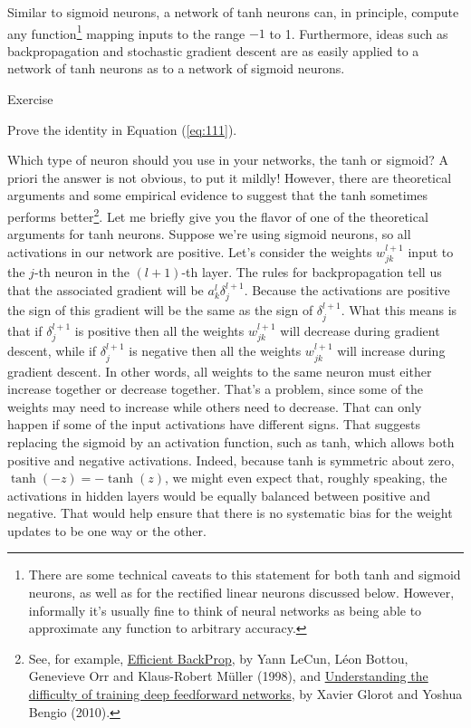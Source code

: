\documentclass[a4paper,twoside,10pt]{book}
\begin{document}
Similar to sigmoid neurons, a network of tanh neurons can, in principle, compute any function\footnote{There are some technical caveats to this statement for both tanh and sigmoid neurons, as well as for the rectified linear neurons discussed below. However, informally it's usually fine to think of neural networks as being able to approximate any function to arbitrary accuracy.} mapping inputs to the range $-1$ to 1. Furthermore, ideas such as backpropagation and stochastic gradient descent are as easily applied to a network of tanh neurons as to a network of sigmoid neurons.

\begin{exercize}{Exercise}
	\item Prove the identity in Equation (\ref{eq:111}).
\end{exercize}
Which type of neuron should you use in your networks, the tanh or sigmoid? A priori the answer is not obvious, to put it mildly! However, there are theoretical arguments and some empirical evidence to suggest that the tanh sometimes performs better\footnote{See, for example, \href{http://yann.lecun.com/exdb/publis/pdf/lecun-98b.pdf}{Efficient BackProp}, by Yann LeCun, L\'eon Bottou, Genevieve Orr and Klaus-Robert M\"uller (1998), and \href{http://jmlr.org/proceedings/papers/v9/glorot10a/glorot10a.pdf}{Understanding the difficulty of training deep feedforward networks}, by Xavier Glorot and Yoshua Bengio (2010).}. Let me briefly give you the flavor of one of the theoretical arguments for tanh neurons. Suppose we're using sigmoid neurons, so all activations in our network are positive. Let's consider the weights $w^{l+1}_{jk}$ input to the $j$-th neuron in the $(l+1)$-th layer. The rules for backpropagation  tell us that the associated gradient will be $a^l_k\delta^{l+1}_{j}$. Because the activations are positive the sign of this gradient will be the same as the sign of $\delta^{l+1}_{j}$. What this means is that if $\delta^{l+1}_{j}$ is positive then all the weights $w^{l+1}_{jk}$ will decrease during gradient descent, while if $\delta^{l+1}_{j}$ is negative then all the weights $w^{l+1}_{jk}$ will increase during gradient descent. In other words, all weights to the same neuron must either increase together or decrease together. That's a problem, since some of the weights may need to increase while others need to decrease. That can only happen if some of the input activations have different signs. That suggests replacing the sigmoid by an activation function, such as tanh, which allows both positive and negative activations. Indeed, because tanh is symmetric about zero, $\tanh(-z)=-\tanh(z)$, we might even expect that, roughly speaking, the activations in hidden layers would be equally balanced between positive and negative. That would help ensure that there is no systematic bias for the weight updates to be one way or the other.
\end{document}
